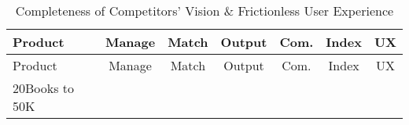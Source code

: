 \documentclass[10pt,openany]{book}
\begin{document}
\begin{longtable}[]{@{}lcccccc@{}}
\caption{Completeness of Competitors' Vision \& Frictionless User
Experience}\tabularnewline
\toprule
\begin{minipage}[b]{0.29\columnwidth}\raggedright
Product\strut
\end{minipage} & \begin{minipage}[b]{0.09\columnwidth}\centering
Manage\strut
\end{minipage} & \begin{minipage}[b]{0.08\columnwidth}\centering
Match\strut
\end{minipage} & \begin{minipage}[b]{0.09\columnwidth}\centering
Output\strut
\end{minipage} & \begin{minipage}[b]{0.07\columnwidth}\centering
Com.\strut
\end{minipage} & \begin{minipage}[b]{0.10\columnwidth}\centering
Index\strut
\end{minipage} & \begin{minipage}[b]{0.10\columnwidth}\centering
UX\strut
\end{minipage}\tabularnewline
\midrule
\endfirsthead
\toprule
\begin{minipage}[b]{0.29\columnwidth}\raggedright
Product\strut
\end{minipage} & \begin{minipage}[b]{0.09\columnwidth}\centering
Manage\strut
\end{minipage} & \begin{minipage}[b]{0.08\columnwidth}\centering
Match\strut
\end{minipage} & \begin{minipage}[b]{0.09\columnwidth}\centering
Output\strut
\end{minipage} & \begin{minipage}[b]{0.07\columnwidth}\centering
Com.\strut
\end{minipage} & \begin{minipage}[b]{0.10\columnwidth}\centering
Index\strut
\end{minipage} & \begin{minipage}[b]{0.10\columnwidth}\centering
UX\strut
\end{minipage}\tabularnewline
\midrule
\endhead
\begin{minipage}[t]{0.29\columnwidth}\raggedright
20Books to 50K\strut
\end{minipage} & \begin{minipage}[t]{0.09\columnwidth}\centering

\end{minipage}
\end{longtable}
\end{document}
